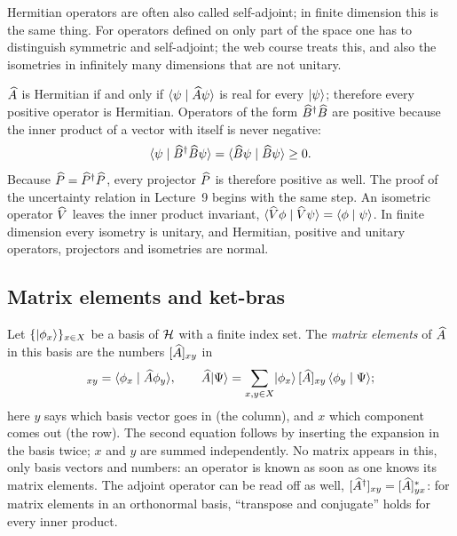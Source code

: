 Hermitian operators are often also called self-adjoint; in finite dimension this is the same thing. For operators defined on only part of the space one has to distinguish symmetric and self-adjoint; the web course treats this, and also the isometries in infinitely many dimensions that are not unitary.

$\widehat{A}$ is Hermitian if and only if $\langle \psi \mid \widehat{A}\psi \rangle$ is real for every $\lvert \psi \rangle$; therefore every positive operator is Hermitian. Operators of the form $\widehat{B}^{\dagger}\widehat{B}$ are positive because the inner product of a vector with itself is never negative:
\begin{equation}
	\langle \psi \mid \widehat{B}^{\dagger}\widehat{B}\psi \rangle = \langle \widehat{B}\psi \mid \widehat{B}\psi \rangle \geq 0.
\end{equation}
Because $\widehat{P} = \widehat{P}^{\dagger}\widehat{P}$, every projector $\widehat{P}$ is therefore positive as well. The proof of the uncertainty relation in Lecture~9 begins with the same step. An isometric operator $\widehat{V}$ leaves the inner product invariant, $\langle \widehat{V}\phi \mid \widehat{V}\psi \rangle = \langle \phi \mid \psi \rangle$. In finite dimension every isometry is unitary, and Hermitian, positive and unitary operators, projectors and isometries are normal.

\subsection{Matrix elements and ket-bras}
Let $\{\lvert \phi_x \rangle\}_{x\in X}$ be a basis of $\mathcal{H}$ with a finite index set. The \emph{matrix elements} of $\widehat{A}$ in this basis are the numbers $[\widehat{A}]_{xy}$ in
\begin{equation}
	[\op{A}]_{xy} = \braket{\phi_x}{\op{A}\phi_y}, \qquad
	\op{A}\ket{\Psi} = \sum_{x,y\in X}\ket{\phi_x}\,[\op{A}]_{xy}\,\braket{\phi_y}{\Psi};
\end{equation}
here $y$ says which basis vector goes in (the column), and $x$ which component comes out (the row). The second equation follows by inserting the expansion in the basis twice; $x$ and $y$ are summed independently. No matrix appears in this, only basis vectors and numbers: an operator is known as soon as one knows its matrix elements. The adjoint operator can be read off as well, $[\widehat{A}^{\dagger}]_{xy} = [\widehat{A}]_{yx}^*$: for matrix elements in an orthonormal basis, ``transpose and conjugate'' holds for every inner product.


